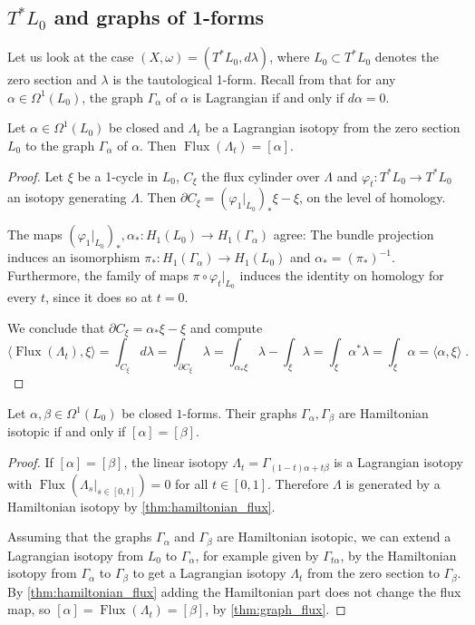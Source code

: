 \documentclass[AIF,Unicode,manuscript]{cedram}
\DeclareMathOperator{\Flux}{Flux}
\begin{document}
\subsection{\texorpdfstring{$T^* L_0$}{T*L} and graphs of 1-forms} 
\label{sec:vdcotangent}

Let us look at the case $(X,ω)=(T^* L_0,d λ)$, where $L_0 ⊂ T^* L_0$ denotes the zero section and $λ$ is the tautological 1-form.
Recall from \cite{McDuffSalamonSympTop} that for any $α ∈ Ω^1(L_0)$, the graph $Γ_α$ of $α$ is Lagrangian if and only if $d α=0$.

\begin{lemma}
  \label{thm:graph_flux}
  Let $α ∈ Ω^1(L_0)$ be closed and $Λ_t$ be a Lagrangian isotopy from the zero section $L_0$ to the graph $Γ_α$ of $α$.
Then $\Flux(Λ_t) = [α]$.
\end{lemma}
\begin{proof}
  Let $ξ$ be a 1-cycle in $L_0$, $C_ξ$ the flux cylinder over $Λ$ and $\varphi_t \colon T^*L_0 \rightarrow T^*L_0$ an isotopy generating $\Lambda$.
Then $∂C_ξ = (\varphi_1\vert_{L_0})_* ξ - ξ$, on the level of homology.

The maps $(\varphi_1\vert_{L_0})_*, \alpha_* \colon H_1(L_0) \rightarrow H_1(\Gamma_{\alpha})$ agree:
The bundle projection induces an isomorphism $\pi_* \colon H_1(Γ_α) \rightarrow H_1(L_0)$ and $\alpha_* = (\pi_*)^{-1}$. Furthermore, the family of maps $\pi \circ \varphi_t\vert_{L_0}$ induces the identity on homology for every $t$, since it does so at $t=0$.

We conclude that $∂C_ξ = α_* ξ - ξ$ and compute
  \[⟨\Flux(Λ_t),ξ ⟩ = ∫_{C_ξ} dλ = ∫_{∂C_ξ} λ = ∫_{α_* ξ}λ - ∫_{ξ} λ = ∫_{ξ} α^* λ = ∫_{ξ} α = ⟨α,ξ⟩ \;.\]
\end{proof}

\begin{lemma}
  \label{thm:graph_hamiltonian_isotopic}
  Let $\alpha,\beta \in  \Omega^1(L_0)$ be closed $1$-forms.
Their graphs $\Gamma_{\alpha}, \Gamma_{\beta}$ are Hamiltonian isotopic if and only if $[\alpha] = [\beta]$.
\end{lemma}
\begin{proof}
If $[\alpha] = [\beta]$, the linear isotopy $\Lambda_t = Γ_{(1-t)α + t β}$ is a Lagrangian isotopy with $\Flux(Λ_s|_{s ∈ [0,t]}) = 0$ for all $t \in [0,1]$.
Therefore $\Lambda$ is generated by a Hamiltonian isotopy by \cref{thm:hamiltonian_flux}.

  Assuming that the graphs $Γ_α$ and $Γ_β$ are Hamiltonian isotopic, we can extend a Lagrangian isotopy from $L_0$ to $Γ_α$, for example given by $Γ_{tα}$, by the Hamiltonian isotopy from $Γ_α$ to $Γ_β$ to get a Lagrangian isotopy $Λ_t$ from the zero section to $Γ_β$.
By \cref{thm:hamiltonian_flux} adding the Hamiltonian part does not change the flux map, so $[α] = \Flux(Λ_t) = [β]$, by \cref{thm:graph_flux}.
\end{proof}
\end{document}
